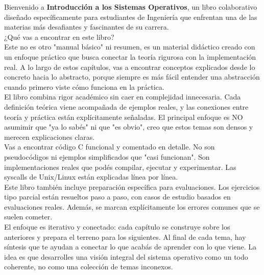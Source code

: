 \begin{center}
  \begin{minipage}{0.9\textwidth}
    \setlength{\parskip}{0.8em}
    Bienvenido a \textbf{Introducción a los Sistemas Operativos}, un libro colaborativo diseñado específicamente 
    para estudiantes de Ingeniería que enfrentan una de las materias más desafiantes y fascinantes de su carrera.\\

    ¿Qué vas a encontrar en este libro?\\
    Este no es otro "manual básico" ni resumen, es un material didáctico creado con un enfoque práctico que busca 
    conectar la teoría rigurosa con la implementación real. A lo largo de estos capítulos, vas a encontrar 
    conceptos explicados desde lo concreto hacia lo abstracto, porque siempre es más fácil entender una abstracción 
    cuando primero viste cómo funciona en la práctica.\\

    El libro combina rigor académico sin caer en complejidad innecesaria. Cada definición teórica viene acompañada 
    de ejemplos reales, y las conexiones entre teoría y práctica están explícitamente señaladas. El principal 
    enfoque es NO asumimir que "ya lo sabés" ni que "es obvio", creo que estos temas son densos y merecen explicaciones claras.\\
    Vas a encontrar código C funcional y comentado en detalle. No son pseudocódigos ni ejemplos simplificados que 
    "casi funcionan". Son implementaciones reales que podés compilar, ejecutar y experimentar. Las syscalls de 
    Unix/Linux están explicadas línea por línea.\\

    Este libro también incluye preparación específica para evaluaciones. Los ejercicios tipo parcial están resueltos 
    paso a paso, con casos de estudio basados en evaluaciones reales. Además, se marcan explícitamente los errores 
    comunes que se suelen cometer.\\

    El enfoque es iterativo y conectado: cada capítulo se construye sobre los anteriores y prepara el terreno para 
    los siguientes. Al final de cada tema, hay síntesis que te ayudan a conectar lo que acabás de aprender con lo 
    que viene. La idea es que desarrolles una visión integral del sistema operativo como un todo coherente, no como 
    una colección de temas inconexos.\\
  \end{minipage}
\end{center}
\newpage
\thispagestyle{empty}


